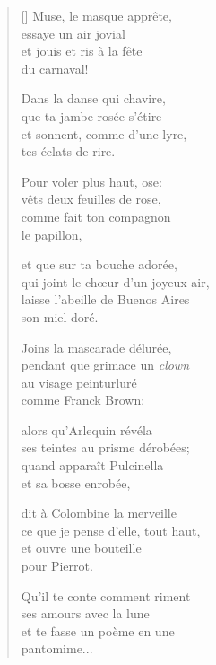 



\settowidth{\versewidth}{pour Guido, dans sa houppelande,}

\bigskip

\begin{verse}[\versewidth]
Muse, le masque apprête, \\
essaye un air jovial \\
et jouis et ris à la fête \\
du carnaval!

Dans la danse qui chavire, \\
que ta jambe rosée s'étire \\
et sonnent, comme d'une lyre, \\
tes éclats de rire.

Pour voler plus haut, ose: \\
vêts deux feuilles de rose, \\
comme fait ton compagnon \\
le papillon,

et que sur ta bouche adorée, \\
qui joint le chœur d'un joyeux air, \\
laisse l'abeille de Buenos Aires \\
son miel doré.

Joins la mascarade délurée, \\
pendant que grimace un \emph{clown} \\
au visage peinturluré \\
comme Franck Brown;

alors qu'Arlequin révéla \\
ses teintes au prisme dérobées; \\
quand apparaît Pulcinella \\
et sa bosse enrobée,

dit à Colombine la merveille \\
ce que je pense d'elle, tout haut, \\
et ouvre une bouteille \\
pour Pierrot.

Qu'il te conte comment riment \\
ses amours avec la lune \\
et te fasse un poème en une \\
pantomime...


\end{verse}
